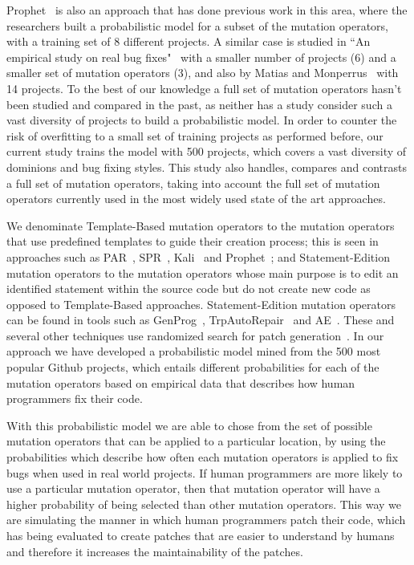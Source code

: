 \documentclass[conference]{IEEEtran}
\begin{document}
Prophet~\cite{long15} is also an approach that has done previous work in this 
area, where the researchers built a 
probabilistic model for a subset of the mutation operators, with a training set 
of 8 different projects. A similar case is studied in ``An empirical study on 
real bug fixes"~\cite{zhong15} with a smaller number of projects (6) and a 
smaller set of 
mutation operators (3), and also by Matias and Monperrus~\cite{matias15} with 14 
projects. To the best of our knowledge a full set of mutation 
operators hasn't been studied and compared in the past, as neither has a study 
consider such a vast diversity of projects to build a probabilistic model. In 
order to counter the 
risk of overfitting to a small set of training projects as performed before, our 
current study trains the model with 500 projects, which covers a vast diversity 
of dominions and bug fixing styles. This study also 
handles, compares and contrasts a full set of mutation operators, taking into
account the full set of mutation operators currently used in the most widely used state of the art approaches.


We denominate Template-Based mutation operators to the mutation operators that 
use predefined templates to guide their creation process; this is seen in 
approaches such 
as PAR~\cite{kim2013}, SPR~\cite{fan15}, Kali~\cite{Qi15} and 
Prophet~\cite{Long2016}; and 
Statement-Edition mutation operators to the mutation operators whose main 
purpose is to edit an identified statement within the source code but do not 
create new code as opposed to 
Template-Based approaches. Statement-Edition mutation operators can be found in 
tools such as GenProg~\cite{legoues2012}, TrpAutoRepair~\cite{Qi13} and 
AE~\cite{Weimer13}.
These and several other techniques use randomized search
for patch generation~\cite{arcuri08,bradbury10,Qi14,Weimer13}. In our approach 
we have developed a probabilistic model mined 
from the 500 most popular Github projects, which 
entails different probabilities for each of the mutation operators based on 
empirical data that describes how human programmers fix their code.

With this probabilistic model we are able to chose from the set of possible
mutation operators that can be applied to a particular location, by using the
probabilities which describe how often each mutation operators is applied
to fix bugs when used in real world projects. If human programmers are more likely to
use a particular mutation operator, then that mutation operator will have a
higher probability of being selected than other mutation operators. This way we 
are simulating the manner in which human programmers patch their code, which has 
being evaluated to create patches that are easier to understand by humans~\cite{kim2013} and 
therefore it increases the maintainability of the patches. 
\end{document}
